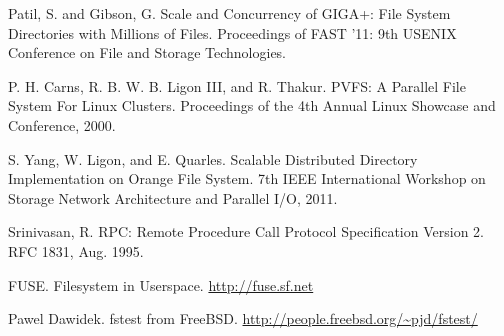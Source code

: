\documentclass[onecolumn, 11pt, letterpaper]{article}
\begin{document}
\begin{thebibliography}{9}

    Patil, S. and Gibson, G. Scale and Concurrency of GIGA+: File System
    Directories with Millions of Files.
    Proceedings of FAST '11: 9th USENIX Conference on File and Storage
    Technologies.

    P. H. Carns, R. B. W. B. Ligon III, and R. Thakur. PVFS: A Parallel File
    System For Linux Clusters. Proceedings of the 4th Annual Linux Showcase
    and Conference, 2000.

    S. Yang, W. Ligon, and E. Quarles. Scalable Distributed Directory
    Implementation on Orange File System. 7th IEEE International Workshop on
    Storage Network Architecture and Parallel I/O, 2011.

    Srinivasan, R. RPC: Remote Procedure Call Protocol Specification Version 2.
    RFC 1831, Aug. 1995.

    FUSE. Filesystem in Userspace. \url{http://fuse.sf.net}

  Pawel Dawidek.  fstest from FreeBSD.  \url{http://people.freebsd.org/~pjd/fstest/}

\end{thebibliography}
\end{document}
